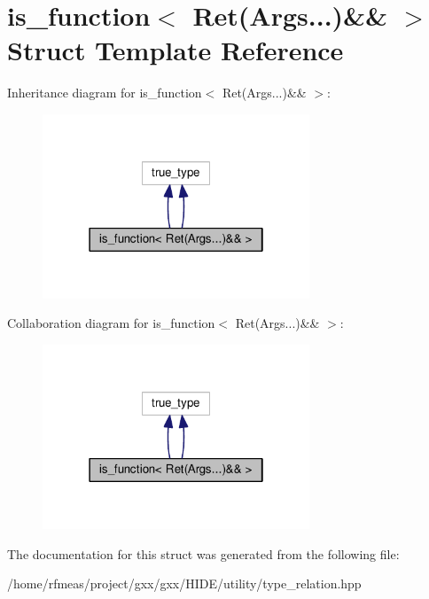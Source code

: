 \hypertarget{structis__function_3_01Ret_07Args_8_8_8_08_6_6_01_4}{}\section{is\+\_\+function$<$ Ret(Args...)\&\& $>$ Struct Template Reference}
\label{structis__function_3_01Ret_07Args_8_8_8_08_6_6_01_4}


Inheritance diagram for is\+\_\+function$<$ Ret(Args...)\&\& $>$\+:
\nopagebreak
\begin{figure}[H]
\begin{center}
\leavevmode
\includegraphics[width=226pt]{structis__function_3_01Ret_07Args_8_8_8_08_6_6_01_4__inherit__graph}
\end{center}
\end{figure}


Collaboration diagram for is\+\_\+function$<$ Ret(Args...)\&\& $>$\+:
\nopagebreak
\begin{figure}[H]
\begin{center}
\leavevmode
\includegraphics[width=226pt]{structis__function_3_01Ret_07Args_8_8_8_08_6_6_01_4__coll__graph}
\end{center}
\end{figure}


The documentation for this struct was generated from the following file\+:\begin{DoxyCompactItemize}
\item 
/home/rfmeas/project/gxx/gxx/\+H\+I\+D\+E/utility/type\+\_\+relation.\+hpp\end{DoxyCompactItemize}
